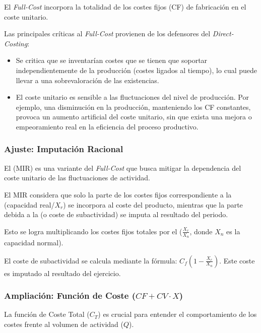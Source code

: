 El \textit{Full-Cost} incorpora la totalidad de los costes fijos (CF) de fabricación en el coste unitario.

Las principales críticas al \textit{Full-Cost} provienen de los defensores del \textit{Direct-Costing}:
\begin{itemize}
    \item {} Se critica que se inventarían costes que se tienen que soportar independientemente de la producción (costes ligados al tiempo), lo cual puede llevar a una sobrevaloración de las existencias.
    \item {} El coste unitario es sensible a las fluctuaciones del nivel de producción. Por ejemplo, una disminución en la producción, manteniendo los CF constantes, provoca un aumento artificial del coste unitario, sin que exista una mejora o empeoramiento real en la eficiencia del proceso productivo.
\end{itemize}

\subsubsection{Ajuste: Imputación Racional}

El  (MIR) es una variante del \textit{Full-Cost} que busca mitigar la dependencia del coste unitario de las fluctuaciones de actividad.

El MIR considera que solo la parte de los costes fijos correspondiente a la  (capacidad real/$X_r$) se incorpora al coste del producto, mientras que la parte debida a la  (o coste de subactividad) se imputa al resultado del periodo.

Esto se logra multiplicando los costes fijos totales por el  ($\frac{X_r}{X_n}$, donde $X_n$ es la capacidad normal).

\begin{ejemplo}
El coste de subactividad se calcula mediante la fórmula: $C_f (1 - \frac{X_r}{X_n})$. Este coste es imputado al resultado del ejercicio.
\end{ejemplo}

\subsubsection{Ampliación: Función de Coste ($CF + CV \cdot X$)}

La función de Coste Total ($C_T$) es crucial para entender el comportamiento de los costes frente al volumen de actividad ($Q$).

